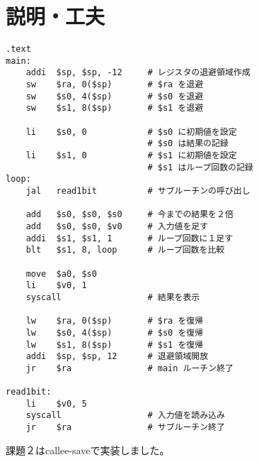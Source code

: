 \documentclass{jarticle}
\begin{document}
  \section{説明・工夫}
    \begin{lstlisting}[caption=assignment1.s]
    .text
main:
    addi  $sp, $sp, -12     # レジスタの退避領域作成
    sw    $ra, 0($sp)       # $ra を退避
    sw    $s0, 4($sp)       # $s0 を退避
    sw    $s1, 8($sp)       # $s1 を退避

    li    $s0, 0            # $s0 に初期値を設定
                            # $s0 は結果の記録
    li    $s1, 0            # $s1 に初期値を設定
                            # $s1 はループ回数の記録
loop:
    jal   read1bit          # サブルーチンの呼び出し

    add   $s0, $s0, $s0     # 今までの結果を２倍
    add   $s0, $s0, $v0     # 入力値を足す
    addi  $s1, $s1, 1       # ループ回数に１足す
    blt   $s1, 8, loop      # ループ回数を比較

    move  $a0, $s0
    li    $v0, 1
    syscall                 # 結果を表示

    lw    $ra, 0($sp)       # $ra を復帰
    lw    $s0, 4($sp)       # $s0 を復帰
    lw    $s1, 8($sp)       # $s1 を復帰
    addi  $sp, $sp, 12      # 退避領域開放
    jr    $ra               # main ルーチン終了

read1bit:
    li    $v0, 5
    syscall                 # 入力値を読み込み
    jr    $ra               # サブルーチン終了
    \end{lstlisting}
    課題２はcallee-saveで実装しました。
\end{document}
